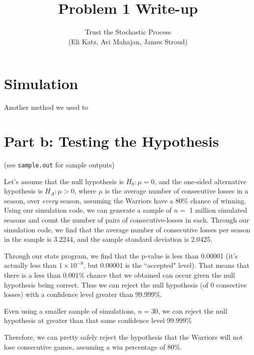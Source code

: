 \documentclass[12pt]{article}
\theoremstyle{nonumberplain}
\begin{document}
 
 
\title{Problem 1 Write-up}%
\author{Trust the Stochastic Process\\
        (Eli Katz, Avi Mahajan, James Stroud)}
 
\maketitle
 
\section{Simulation}
Another method we used to 


\section{Part b: Testing the Hypothesis}
(see \lstinline|sample.out| for sample outputs)

Let's assume that the null hypothesis is $H_0: \mu = 0$, and the one-sided alternative hypothesis is $H_A: \mu > 0$, where $\mu$ is the average number of consecutive losses in a season, over \textit{every} season, assuming the Warriors have a 80\% chance of winning. Using our simulation code, we can generate a sample of $n=$ 1 million simulated seasons and count the number of pairs of consecutive-losses in each. Through our simulation code, we find that the average number of consecutive losses per season in the sample is 3.2244, and the sample standard deviation is 2.0425. 

Through our stats program, we find that the p-value is less than 0.00001 (it's actually less than $1\times 10^{-8}$, but 0.00001 is the ``accepted" level). That means that there is a less than 0.001\% chance that we obtained can occur given the null hypothesis being correct. Thus we can reject the null hypothesis (of 0 consective losses) with a confidence level greater than 99.999\%. 

Even using a smaller sample of simulations, $n=30$, we can reject the null hypothesis at greater than that same confidence level 99.999\%

Therefore, we can pretty safely reject the hypothesis that the Warriors will not lose consecutive games, assuming a win percentage of 80\%.
\end{document}
